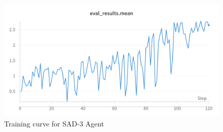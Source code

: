 
\begin{figure}[h]
  \centering
  \includegraphics[width=\linewidth]{results/SAD-3-mean.png}
  \caption{
    Training curve for SAD-3 Agent
  }
  \label{fig:sad3}
\end{figure}